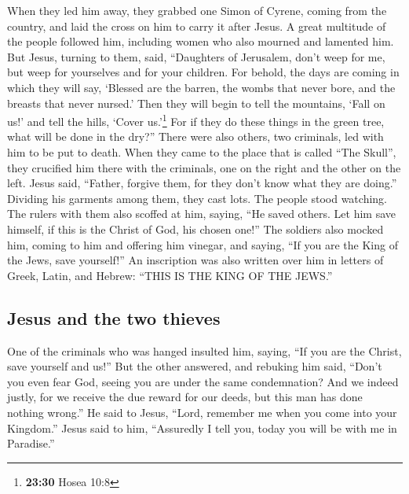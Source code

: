  When they led him away, they grabbed one Simon of
Cyrene, coming from the country, and laid the cross on him to carry it
after Jesus.  A great multitude of the people followed
him, including women who also mourned and lamented him. 
But Jesus, turning to them, said, ``Daughters of Jerusalem, don't weep
for me, but weep for yourselves and for your children. 
For behold, the days are coming in which they will say, `Blessed are the
barren, the wombs that never bore, and the breasts that never nursed.'
 Then they will begin to tell the mountains, `Fall on
us!' and tell the hills, `Cover us.'\footnote{\textbf{23:30} Hosea 10:8}
 For if they do these things in the green tree, what will
be done in the dry?''  There were also others, two
criminals, led with him to be put to death.  When they
came to the place that is called ``The Skull'', they crucified him there
with the criminals, one on the right and the other on the left.
 Jesus said, ``Father, forgive them, for they don't know
what they are doing.'' Dividing his garments among them, they cast lots.
 The people stood watching. The rulers with them also
scoffed at him, saying, ``He saved others. Let him save himself, if this
is the Christ of God, his chosen one!''  The soldiers
also mocked him, coming to him and offering him vinegar, 
and saying, ``If you are the King of the Jews, save yourself!''
 An inscription was also written over him in letters of
Greek, Latin, and Hebrew: ``THIS IS THE KING OF THE JEWS.''

\hypertarget{jesus-and-the-two-thieves}{%
\subsection{Jesus and the two thieves}\label{jesus-and-the-two-thieves}}

 One of the criminals who was hanged insulted him,
saying, ``If you are the Christ, save yourself and us!'' 
But the other answered, and rebuking him said, ``Don't you even fear
God, seeing you are under the same condemnation?  And we
indeed justly, for we receive the due reward for our deeds, but this man
has done nothing wrong.''  He said to Jesus, ``Lord,
remember me when you come into your Kingdom.''  Jesus
said to him, ``Assuredly I tell you, today you will be with me in
Paradise.''

